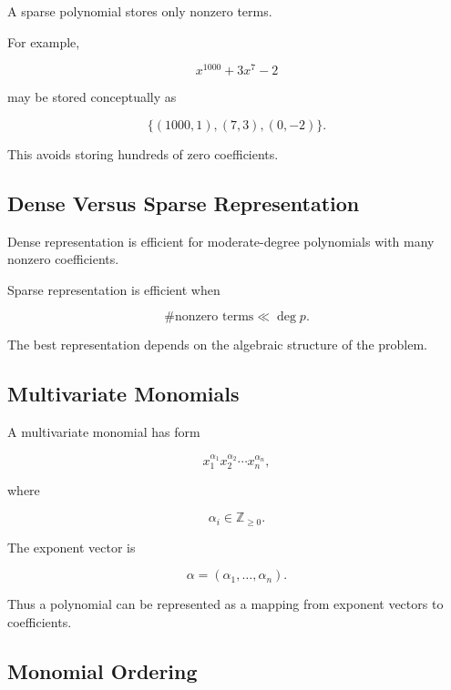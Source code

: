 A sparse polynomial stores only nonzero terms.

For example,

\[
x^{1000}+3x^7-2
\]

may be stored conceptually as

\[
\boxed{
\{
(1000,1),
(7,3),
(0,-2)
\}.
}
\]

This avoids storing hundreds of zero coefficients.

\subsection{Dense Versus Sparse Representation}
\label{subsec:dense-vs-sparse-polynomial}

Dense representation is efficient for moderate-degree polynomials with
many nonzero coefficients.

Sparse representation is efficient when

\[
\boxed{
\#\text{nonzero terms}
\ll
\deg p.
}
\]

The best representation depends on the algebraic structure of the
problem.

\subsection{Multivariate Monomials}
\label{subsec:multivariate-monomials}

A multivariate monomial has form

\[
\boxed{
x_1^{\alpha_1}
x_2^{\alpha_2}
\cdots
x_n^{\alpha_n},
}
\]

where

\[
\alpha_i\in\mathbb{Z}_{\geq0}.
\]

The exponent vector is

\[
\boxed{
\alpha
=
(\alpha_1,\ldots,\alpha_n).
}
\]

Thus a polynomial can be represented as a mapping from exponent vectors to
coefficients.

\subsection{Monomial Ordering}
\label{subsec:monomial-ordering}

